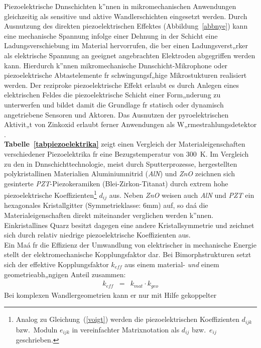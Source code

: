 Piezoelektrische Dnnschichten k”nnen in mikromechanischen Anwendungen
gleichzeitig als sensitive und aktive Wandlerschichten eingesetzt
werden. Durch Ausnutzung des direkten piezoelektrischen Effektes
(Abbildung~\ref{abbnye}) kann eine mechanische Spannung infolge einer
Dehnung in der Schicht
eine Ladungsverschiebung im Material hervorrufen, die ber einen
Ladungsverst„rker als elektrische Spannung an geeignet angebrachten
Elektroden abgegriffen werden kann.  Hierdurch k”nnen mikromechanische
Dnnschicht-Mikrophone \cite{Fra88, Kim87} oder piezoelektrische
Abtastelemente fr schwingungsf„hige Mikrostukturen \cite{Blo90}
realisiert werden.  Der reziproke piezoelektrische Effekt erlaubt es
durch Anlegen eines elektrischen Feldes die piezoelektrische Schicht
einer Form„nderung zu unterwerfen und bildet damit die Grundlage fr
statisch oder dynamisch angetriebene Sensoren und Aktoren. Das Ausnutzen
der pyroelektrischen Aktivit„t von Zinkoxid erlaubt ferner Anwendungen
als W„rmestrahlungsdetektor \cite{Pol84}. \\
{\bf Tabelle~\ref{tabpiezoelektrika}} zeigt einen Vergleich
der Materialeigenschaften verschiedener Piezoelektrika
\cite{Fra88, Ike90a, LB82, Tic80, Sie81} fr eine
Bezugstemperatur von 300~K. Im Vergleich zu den in
Dnnschichttechnologie, meist durch Sputterprozesse, hergestellten
polykristallinen Materialien Aluminiumnitrid ({\em AlN}) und {\em ZnO}
zeichnen sich gesinterte {\em PZT}-Piezokeramiken (Blei-Zirkon-Titanat)
durch extrem hohe piezoelektrische Koeffizienten\footnote{Analog zu
Gleichung~(\ref{voigt}) werden die piezoelektrischen Koeffizienten
$d_{ijk}$ bzw.\ Moduln $e_{ijk}$ in vereinfachter Matrixnotation als
$d_{ij}$ bzw.\ $e_{ij}$ geschrieben.}
$d_{ij}$ aus.  Neben {\em ZnO} weisen auch
{\em AlN} und {\em PZT} ein hexagonales Kristallgitter
(Symmetrieklasse: 6mm) auf, so daá die
Materialeigenschaften direkt miteinander verglichen werden k”nnen.
Einkristallines Quarz besitzt dagegen eine andere Kristallsymmetrie
und zeichnet sich durch relativ niedrige piezoelektrische Koeffizienten
aus.\\
%
Ein Maá fr die Effizienz der Umwandlung von elektrischer in mechanische
Energie stellt der elektromechanische Kopplungsfaktor dar. Bei
Bimorphstrukturen setzt sich der effektive Kopplungsfaktor $k_{eff}$
aus einem material- {\em und} einem geometrieabh„ngigen Anteil zusammen:
\begin{eqnarray}
\label{kgeo}
 k_{eff} & = & k_{mat} \cdot k_{geo}
\end{eqnarray}
Bei komplexen Wandlergeometrien kann er nur mit Hilfe gekoppelter
